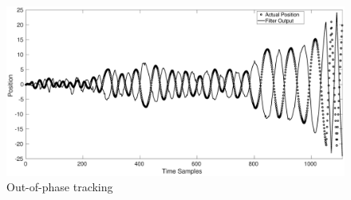 \documentclass[12pt]{article}
\begin{document}
\begin{figure}[h]
\centering
	\includegraphics[scale = 0.2]{./Figures/outphase.eps}
	\caption{Out-of-phase tracking}
	\label{fig:outphase}
\end{figure}
\end{document}
